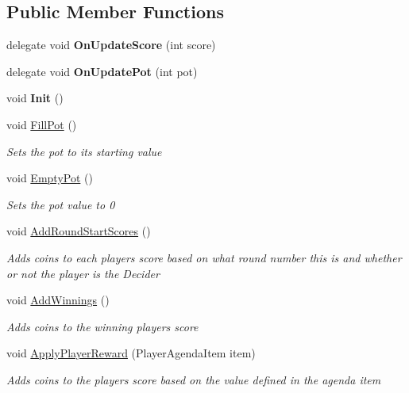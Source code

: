\subsection*{Public Member Functions}
\begin{DoxyCompactItemize}
\item 
delegate void {\bfseries On\+Update\+Score} (int score)\hypertarget{class_score_manager_a0d535c5b349c2b0986b13ffcefbbfcd4}{}\label{class_score_manager_a0d535c5b349c2b0986b13ffcefbbfcd4}

\item 
delegate void {\bfseries On\+Update\+Pot} (int pot)\hypertarget{class_score_manager_acf4a27a78b14dcc45d59fbad960335df}{}\label{class_score_manager_acf4a27a78b14dcc45d59fbad960335df}

\item 
void {\bfseries Init} ()\hypertarget{class_score_manager_a5a4a682601029dcffa1bc6a79c78931e}{}\label{class_score_manager_a5a4a682601029dcffa1bc6a79c78931e}

\item 
void \hyperlink{class_score_manager_a2df20bbab8cd763e80b3f6e023552c62}{Fill\+Pot} ()
\begin{DoxyCompactList}\small\item\em Sets the pot to its starting value \end{DoxyCompactList}\item 
void \hyperlink{class_score_manager_a8963c413e2eb854856f32419cb41424a}{Empty\+Pot} ()
\begin{DoxyCompactList}\small\item\em Sets the pot value to 0 \end{DoxyCompactList}\item 
void \hyperlink{class_score_manager_a11408d13d0abff357b56d99324c6037b}{Add\+Round\+Start\+Scores} ()
\begin{DoxyCompactList}\small\item\em Adds coins to each player\textquotesingle{}s score based on what round number this is and whether or not the player is the Decider \end{DoxyCompactList}\item 
void \hyperlink{class_score_manager_addad3c65a8df534fb8d897a9f2b2b3d8}{Add\+Winnings} ()
\begin{DoxyCompactList}\small\item\em Adds coins to the winning player\textquotesingle{}s score \end{DoxyCompactList}\item 
void \hyperlink{class_score_manager_a01d67da43955f99b3715971e5fadce01}{Apply\+Player\+Reward} (Player\+Agenda\+Item item)
\begin{DoxyCompactList}\small\item\em Adds coins to the player\textquotesingle{}s score based on the value defined in the agenda item \end{DoxyCompactList}\end{DoxyCompactItemize}
